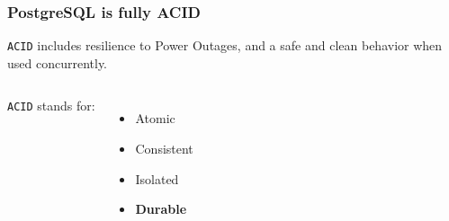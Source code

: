 \documentclass[xcolor=dvipsnames]{beamer}
\begin{document}
{
  \begin{frame}

    \frametitle{PostgreSQL is fully ACID}

    \texttt{ACID} includes resilience to Power Outages, and a safe and clean
    behavior when used concurrently.
    
    \vfill

    \begin{columns}[c]
      \texttt{ACID} stands for:
      \begin{itemize}
      \item Atomic
      \item Consistent
      \item Isolated
      \item \textbf{Durable}
      \end{itemize}
    \end{columns}
  \end{frame}
}

{
  \begin{frame}[plain]
  \end{frame}
}
\end{document}

